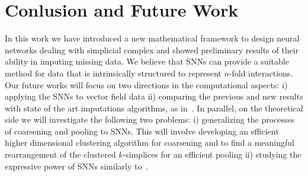 \section{Conlusion and Future Work}

In this work we have introduced a new mathematical framework to design neural networks dealing with simplicial complex and showed preliminary results of their ability in imputing missing data. We believe that SNNs can provide a suitable method for data that is intrinsically structured to represent $n$-fold interactions.
Our future works will focus on two directions in the computational aspects:  i) applying the SNNs to vector field data ii) comparing the previous and new results with state of the art imputations algorithms, as in~\cite{spinelli2020neural}. 
In parallel, on the theoretical side we will investigate the following two problems: i) generalizing the processes of coarsening and pooling to SNNs. This will involve developing an efficient higher dimensional clustering algorithm for coarsening and to find a meaningful rearrangement of the clustered $k$-simplices for an efficient pooling ii) studying the expressive power of SNNs similarly to~\cite{morris2019weisfeiler}.




